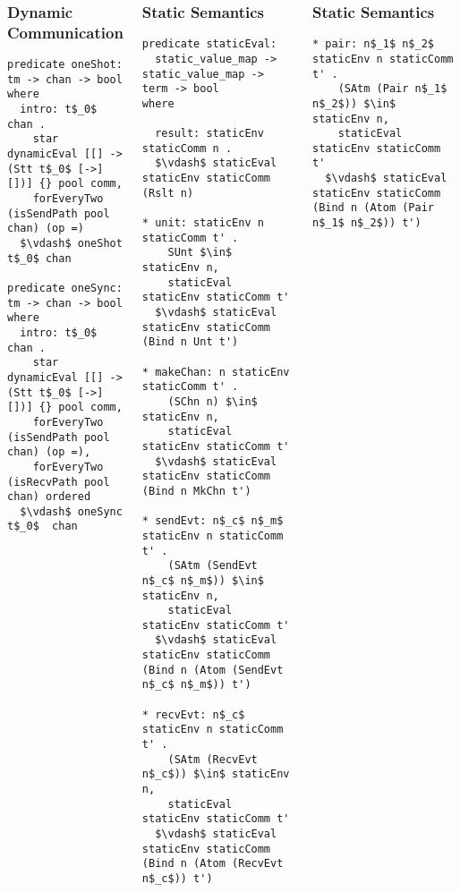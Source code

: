 \documentclass{beamer}
\begin{document}
\begin{frame}[fragile]
\begin{columns}
\begin{frame}[fragile]
	\frametitle{Dynamic Communication}
\begin{lstlisting}[language=logic, mathescape]
predicate oneShot: tm -> chan -> bool where
  intro: t$_0$ chan .
    star dynamicEval [[] -> (Stt t$_0$ [->] [])] {} pool comm,
    forEveryTwo (isSendPath pool chan) (op =)
  $\vdash$ oneShot t$_0$ chan

predicate oneSync: tm -> chan -> bool where
  intro: t$_0$ chan .
    star dynamicEval [[] -> (Stt t$_0$ [->] [])] {} pool comm,
    forEveryTwo (isSendPath pool chan) (op =),
    forEveryTwo (isRecvPath pool chan) ordered 
  $\vdash$ oneSync t$_0$  chan
\end{lstlisting}
\end{frame}


\begin{frame}[fragile]
	\frametitle{Static Semantics}
\begin{lstlisting}[language=logic, mathescape]
predicate staticEval:
  static_value_map -> static_value_map -> term -> bool
where

  result: staticEnv staticComm n .
  $\vdash$ staticEval staticEnv staticComm (Rslt n)

* unit: staticEnv n staticComm t' .
    SUnt $\in$ staticEnv n,
    staticEval staticEnv staticComm t'
  $\vdash$ staticEval staticEnv staticComm (Bind n Unt t')

* makeChan: n staticEnv staticComm t' .
    (SChn n) $\in$ staticEnv n,
    staticEval staticEnv staticComm t'
  $\vdash$ staticEval staticEnv staticComm (Bind n MkChn t')

* sendEvt: n$_c$ n$_m$ staticEnv n staticComm t' .
    (SAtm (SendEvt n$_c$ n$_m$)) $\in$ staticEnv n,
    staticEval staticEnv staticComm t' 
  $\vdash$ staticEval staticEnv staticComm (Bind n (Atom (SendEvt n$_c$ n$_m$)) t')

* recvEvt: n$_c$ staticEnv n staticComm t' . 
    (SAtm (RecvEvt n$_c$)) $\in$ staticEnv n,
    staticEval staticEnv staticComm t'
  $\vdash$ staticEval staticEnv staticComm (Bind n (Atom (RecvEvt n$_c$)) t')
\end{lstlisting}
\end{frame}


\begin{frame}[fragile]
	\frametitle{Static Semantics}
\begin{lstlisting}[language=logic, mathescape]
* pair: n$_1$ n$_2$ staticEnv n staticComm t' .
    (SAtm (Pair n$_1$ n$_2$)) $\in$ staticEnv n,
    staticEval staticEnv staticComm t'
  $\vdash$ staticEval staticEnv staticComm (Bind n (Atom (Pair n$_1$ n$_2$)) t')


\end{lstlisting}
\end{frame}
\end{columns}
\end{frame}
\end{document}
